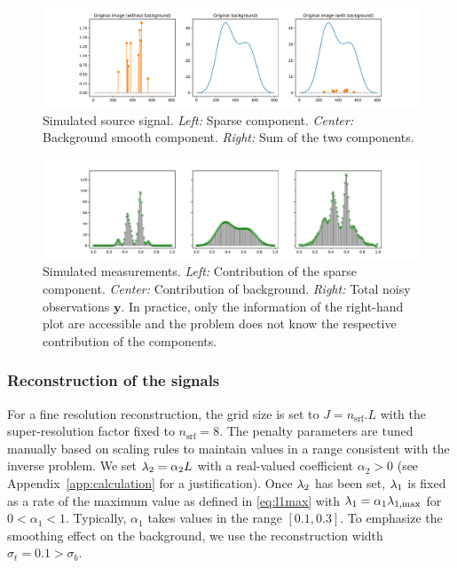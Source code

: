 \documentclass[12pt]{article}
\begin{document}
            \begin{figure}[t]
                \centering
                \includegraphics[width=\linewidth]{figures/simple_reco/gt.pdf}        
                \caption{Simulated source signal. \textit{Left:} Sparse component. \textit{Center:} Background smooth component. \textit{Right:} Sum of the two components. %
                }
                \label{fig:simple:source}
            \end{figure}
        
            \begin{figure}[t]
                \centering
                \includegraphics[width=\linewidth]{figures/simple_reco/measurements.pdf}        
                \caption{Simulated measurements. \textit{Left:} Contribution of the sparse component. \textit{Center:} Contribution of background. \textit{Right:} Total noisy observations $\bm{y}$. In practice, only the information of the right-hand plot are accessible and the problem does not know the respective contribution of the components.}
                \label{fig:simple:measurements}
            \end{figure}

        \subsubsection{Reconstruction of the signals}
        For a fine resolution reconstruction, the grid size is set to $J = n_\mathrm{srf} . L$ with the super-resolution factor fixed to $n_\mathrm{srf}=8$. The penalty parameters are tuned manually based on scaling rules to maintain values in a range consistent with the inverse problem. We set $\lambda_{2} = \alpha_2 L$ with a real-valued coefficient $\alpha_2 >0$ (see Appendix~\ref{app:calculation} for a justification).
        Once $\lambda_{2}$ has been set, $\lambda_{1}$ is fixed as a rate of the maximum value as defined in \eqref{eq:l1max} with $\lambda_{1} = \alpha_1 \lambda_{1, \mathrm{max}}$ for $0 < \alpha_1 <1$. Typically, $\alpha_1$ takes values in the range $[0.1, 0.3]$. To emphasize the smoothing effect on the background, we use the reconstruction width $\sigma_t = 0.1 > \sigma_b$.
\end{document}
